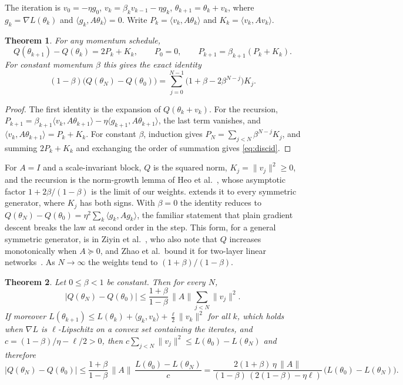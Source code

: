 \documentclass[11pt]{article}
\newtheorem{theorem}{Theorem}
\theoremstyle{remark}
\theoremstyle{definition}
\newcommand{\ip}[2]{\langle #1,#2\rangle}
\begin{document}
The iteration is $v_0=-\eta g_0$, $v_{k}=\beta_kv_{k-1}-\eta g_k$, $\theta_{k+1}=\theta_k+v_k$, where $g_k=\nabla L(\theta_k)$ and $\ip{g_k}{A\theta_k}=0$. Write $P_k=\ip{v_k}{A\theta_k}$ and $K_k=\ip{v_k}{Av_k}$.

\begin{theorem}\label{thm:disc}
For any momentum schedule,
\[
Q(\theta_{k+1})-Q(\theta_k)=2P_k+K_k,\qquad P_0=0,\qquad P_{k+1}=\beta_{k+1}(P_k+K_k).
\]
For constant momentum $\beta$ this gives the exact identity
\begin{equation}\label{eq:discid}
(1-\beta)\bigl(Q(\theta_N)-Q(\theta_0)\bigr)=\sum_{j=0}^{N-1}\bigl(1+\beta-2\beta^{N-j}\bigr)K_j .
\end{equation}
\end{theorem}

\begin{proof}
The first identity is the expansion of $Q(\theta_k+v_k)$. For the recursion, $P_{k+1}=\beta_{k+1}\ip{v_k}{A\theta_{k+1}}-\eta\ip{g_{k+1}}{A\theta_{k+1}}$, the last term vanishes, and $\ip{v_k}{A\theta_{k+1}}=P_k+K_k$. For constant $\beta$, induction gives $P_N=\sum_{j<N}\beta^{N-j}K_j$, and summing $2P_k+K_k$ and exchanging the order of summation gives \eqref{eq:discid}.
\end{proof}

For $A=I$ and a scale-invariant block, $Q$ is the squared norm, $K_j=\|v_j\|^2\ge0$, and the recursion is the norm-growth lemma of Heo et al.~\cite{heo2021}, whose asymptotic factor $1+2\beta/(1-\beta)$ is the limit of our weights.  extends it to every symmetric generator, where $K_j$ has both signs. With $\beta=0$ the identity reduces to $Q(\theta_N)-Q(\theta_0)=\eta^2\sum_k\ip{g_k}{Ag_k}$, the familiar statement that plain gradient descent breaks the law at second order in the step. This form, for a general symmetric generator, is in Ziyin et al.~\cite[Appendix D]{ziyin2024}, who also note that $Q$ increases monotonically when $A\succeq0$, and Zhao et al.\ bound it for two-layer linear networks~\cite[Proposition E.1]{zhao2023}. As $N\to\infty$ the weights tend to $(1+\beta)/(1-\beta)$.

\begin{theorem}\label{thm:discbound}
Let $0\le\beta<1$ be constant. Then for every $N$,
\[
|Q(\theta_N)-Q(\theta_0)|\le\frac{1+\beta}{1-\beta}\,\|A\|\sum_{j<N}\|v_j\|^2 .
\]
If moreover $L(\theta_{k+1})\le L(\theta_k)+\ip{g_k}{v_k}+\tfrac\ell2\|v_k\|^2$ for all $k$, which holds when $\nabla L$ is $\ell$-Lipschitz on a convex set containing the iterates, and $c=(1-\beta)/\eta-\ell/2>0$, then $c\sum_{j<N}\|v_j\|^2\le L(\theta_0)-L(\theta_N)$ and therefore
\[
|Q(\theta_N)-Q(\theta_0)|\le\frac{1+\beta}{1-\beta}\,\|A\|\,\frac{L(\theta_0)-L(\theta_N)}{c}
=\frac{2(1+\beta)\,\eta\,\|A\|}{(1-\beta)\,(2(1-\beta)-\eta\ell)}\,\bigl(L(\theta_0)-L(\theta_N)\bigr).
\]
\end{theorem}
\end{document}
